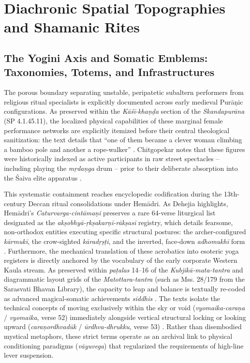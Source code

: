\documentclass[11pt,twoside,letterpaper]{article}
\begin{document}
\section{Diachronic Spatial Topographies and Shamanic Rites}
\label{sec:diachronic_spatial_topographies}

\subsection{The Yogini Axis and Somatic Emblems: Taxonomies, Totems, and Infrastructures}

The porous boundary separating unstable, peripatetic subaltern performers from religious ritual specialists is explicitly documented across early medieval Purāṇic configurations. As preserved within the \textit{Kāśī-khaṇḍa} section of the \textit{Skandapurāna} (SP 4.1.45.11), the localized physical capabilities of these marginal female performance networks are explicitly itemized before their central theological sanitization: the text details that “one of them became a clever woman climbing a bamboo pole and another a rope-walker” \citep{Shastri1991}. Chitgopekar notes that these figures were historically indexed as active participants in raw street spectacles -- including playing the \textit{ mṛdaṇga} drum -- prior to their deliberate absorption into the Śaiva elite apparatus \citep{Chitgopekar2002}.

This systematic containment reaches encyclopedic codification during the 13th-century Deccan ritual consolidations under Hemādri. As Dehejia highlights, Hemādri’s \textit{Caturvarga-cintāmaṇi} preserves a rare 64-verse liturgical list designated as the \textit{akṣobhyā-ṛkṣakarṇī-rākṣasī} registry, which details fearsome, non-orthodox entities executing specific structural postures: the archer-configured \textit{kārmukī}, the crow-sighted \textit{kāradṛṣṭi}, and the inverted, face-down \textit{adhomukhī} form \citep{Dehejia1986}. Furthermore, the mechanical translation of these acrobatics into esoteric yoga registers is directly anchored by the vocabulary of the early corporate Western Kaula stream. As preserved within \textit{paṭalas} 14–16 of the \textit{Kubjikā-mata-tantra} and diagrammatic layout grids of the \textit{ Matottara-tantra} (such as Mss. 28/179 from the Sarasvati Bhavan Library), the capacity to leap and balance is textually re-coded as advanced magical-somatic achievements \textit{siddhis} \citep{Dehejia1986}. The texts isolate the technical concepts of moving exclusively within the sky or void (\textit{vyomaika-caraṇa} / \textit{vyomaika}, verse 52) immediately alongside vertical structural locking or looking upward (\textit{caraṇordhvadūk} / \textit{ūrdhva-dhrukku}, verse 53) \citep{Dehejia1986, Mallinson2007}. Rather than disembodied mystical metaphors, these strict terms operate as an archival link to physical conditioning paradigms (\textit{vāyuvega}) that regularized the requirements of high-line lever suspension.
\end{document}
